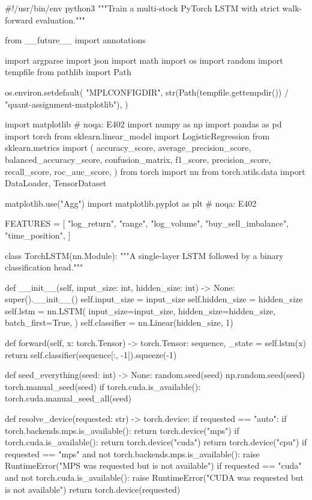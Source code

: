 \documentclass[UTF8,a4paper,fontset=fandol]{ctexart}
\begin{document}
\begin{ProjectCode}
#!/usr/bin/env python3
"""Train a multi-stock PyTorch LSTM with strict walk-forward evaluation."""

from __future__ import annotations

import argparse
import json
import math
import os
import random
import tempfile
from pathlib import Path

os.environ.setdefault(
    "MPLCONFIGDIR",
    str(Path(tempfile.gettempdir()) / "quant-assignment-matplotlib"),
)

import matplotlib  # noqa: E402
import numpy as np
import pandas as pd
import torch
from sklearn.linear_model import LogisticRegression
from sklearn.metrics import (
    accuracy_score,
    average_precision_score,
    balanced_accuracy_score,
    confusion_matrix,
    f1_score,
    precision_score,
    recall_score,
    roc_auc_score,
)
from torch import nn
from torch.utils.data import DataLoader, TensorDataset

matplotlib.use("Agg")
import matplotlib.pyplot as plt  # noqa: E402


FEATURES = [
    "log_return",
    "range",
    "log_volume",
    "buy_sell_imbalance",
    "time_position",
]


class TorchLSTM(nn.Module):
    """A single-layer LSTM followed by a binary classification head."""

    def __init__(self, input_size: int, hidden_size: int) -> None:
        super().__init__()
        self.input_size = input_size
        self.hidden_size = hidden_size
        self.lstm = nn.LSTM(
            input_size=input_size,
            hidden_size=hidden_size,
            batch_first=True,
        )
        self.classifier = nn.Linear(hidden_size, 1)

    def forward(self, x: torch.Tensor) -> torch.Tensor:
        sequence, _state = self.lstm(x)
        return self.classifier(sequence[:, -1]).squeeze(-1)


def seed_everything(seed: int) -> None:
    random.seed(seed)
    np.random.seed(seed)
    torch.manual_seed(seed)
    if torch.cuda.is_available():
        torch.cuda.manual_seed_all(seed)


def resolve_device(requested: str) -> torch.device:
    if requested == "auto":
        if torch.backends.mps.is_available():
            return torch.device("mps")
        if torch.cuda.is_available():
            return torch.device("cuda")
        return torch.device("cpu")
    if requested == "mps" and not torch.backends.mps.is_available():
        raise RuntimeError("MPS was requested but is not available")
    if requested == "cuda" and not torch.cuda.is_available():
        raise RuntimeError("CUDA was requested but is not available")
    return torch.device(requested)



\end{ProjectCode}
\end{document}
